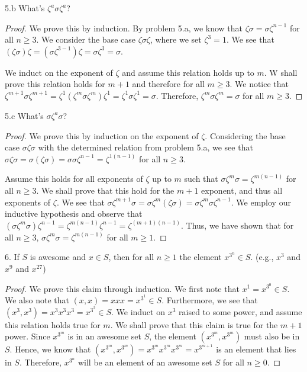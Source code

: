 \documentclass[a4paper,12pt]{article}
\begin{document}
5.b What's $\zeta^a \sigma \zeta^a$?

\begin{proof}
    We prove this by induction. By problem 5.a, we know that $\zeta \sigma = \sigma \zeta^{n-1}$ for all $n \geq 3$. We consider the base case $ \zeta \sigma \zeta$, where we set  $\zeta^3 =1$. We see that $(\zeta \sigma) \zeta = (\sigma \zeta^{3-1}) \zeta = \sigma \zeta^3 = \sigma$.

    We induct on the exponent of $\zeta$ and assume this relation holds up to $m$. W shall prove this relation holds for $m+1$ and therefore for all $m \geq 3$. We notice that $\zeta^{m+1} \sigma \zeta^{m+1} = \zeta^1 (\zeta^m \sigma \zeta^m) \zeta^1 = \zeta^1 \sigma \zeta^1 = \sigma$. Therefore, $\zeta^m \sigma \zeta^m = \sigma$ for all $m \geq 3$.

\end{proof}
 
5.c What's $\sigma \zeta^a \sigma$?

\begin{proof}
    We prove this by induction on the exponent of $\zeta$. Considering the base case $\sigma \zeta \sigma$ with the determined relation from problem 5.a, we see that $\sigma \zeta \sigma = \sigma (\zeta \sigma) = \sigma \sigma \zeta^{n-1} = \zeta^{1(n-1)}$ for all $n \geq 3$. 

    Assume this holds for all exponents of $\zeta$ up to $m$ such that $\sigma \zeta^m \sigma = \zeta^{m(n-1)}$ for all $n \geq 3$. We shall prove that this hold for the $m+1$ exponent, and thus all exponents of $\zeta$. We see that $\sigma \zeta^{m+1} \sigma = \sigma \zeta^m (\zeta \sigma) = \sigma \zeta^m \sigma \zeta^{n-1}$. We employ our inductive hypothesis and observe that $(\sigma \zeta^m \sigma) \zeta^{n-1} = \zeta^{m(n-1)} \zeta^{n-1} = \zeta^{(m+1)(n-1)}.$ Thus, we have shown that for all $n \geq 3$, $\sigma \zeta^m \sigma = \zeta^{m(n-1)}$ for all $m \geq 1$.
\end{proof}


6. If $S$ is awesome and $x \in S$, then for all $n \geq 1$ the element $x^{3^{n}} \in S$.  (e.g., $x^3$ and $x^9$ and $x^{27}$)

\begin{proof}
    We prove this claim through induction. We first note that $x^1 = x^{3^0} \in S$. We also note that $(x, x) = x x x = x^{3^1} \in S$. Furthermore, we see that $(x^3, x^3) = x^3 x^3 x^3 = x^{3^2} \in S$. We induct on $x^3$ raised to some power, and assume this relation holds true for $m$. We shall prove that this claim is true for the $m+1$ power. Since $x^{3^m}$ is in an awesome set $S$, the element $(x^{3^m}, x^{3^m})$ must also be in $S$. Hence, we know that $(x^{3^m}, x^{3^m}) = x^{3^m} x^{3^m} x^{3^m} = x^{3^{m+1}}$ is an element that lies in $S$. Therefore, $x^{3^{n}}$ will be an element of an awesome set $S$ for all $n \geq 0$.
\end{proof}
\end{document}
